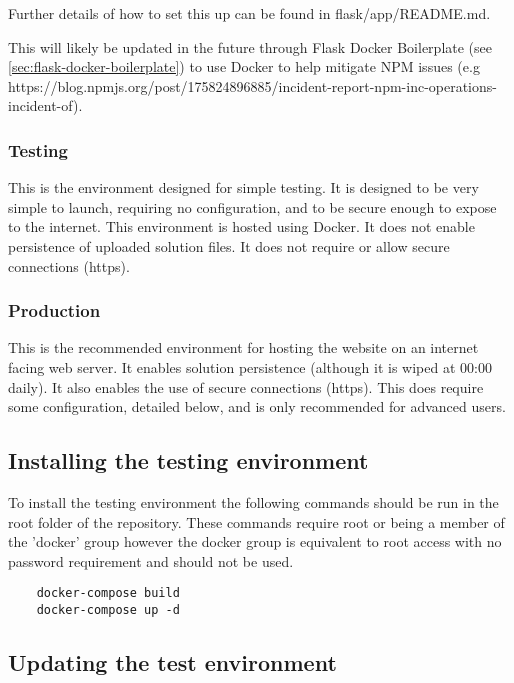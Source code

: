 Further details of how to set this up can be found in flask/app/README.md.

This will likely be updated in the future through Flask Docker Boilerplate (see \ref{sec:flask-docker-boilerplate}) to use Docker to help mitigate NPM issues (e.g https://blog.npmjs.org/post/175824896885/incident-report-npm-inc-operations-incident-of).

\subsubsection{Testing}

This is the environment designed for simple testing.  It is designed to be very simple to launch, requiring no configuration, and to be secure enough to expose to the internet.  This environment is hosted using Docker.  It does not enable persistence of uploaded solution files.  It does not require or allow secure connections (https).

\subsubsection{Production}

This is the recommended environment for hosting the website on an internet facing web server.  It enables solution persistence (although it is wiped at 00:00 daily).  It also enables the use of secure connections (https).  This does require some configuration, detailed below, and is only recommended for advanced users.

\subsection{Installing the testing environment}

To install the testing environment the following commands should be run in the root folder of the repository.  These commands require root or being a member of the 'docker' group however the docker group is equivalent to root access with no password requirement and should not be used.

\begin{verbatim}
	docker-compose build
	docker-compose up -d
\end{verbatim}

\subsection{Updating the test environment}

